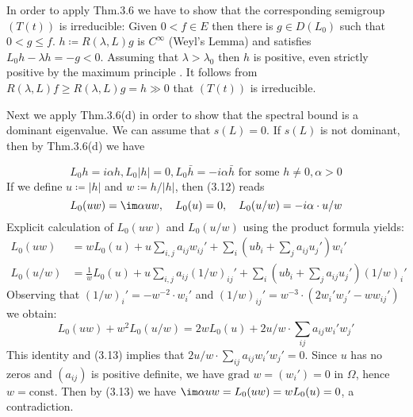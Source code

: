 \begin{examples}
	In order to apply Thm.3.6 we have to show that the corresponding semigroup $(T(t))$ is irreducible:
	Given $0 < f \in E$ then there is $g \in D(L_{0})$ such that $0 < g \leq f$.
	$h \coloneq R(\lambda,L)g$ is $C^{\infty}$ (Weyl's Lemma) and satisfies $L_{0}h - \lambda h = -g < 0$.
	Assuming that $\lambda > \lambda_{0}$ then $h$ is positive, even strictly positive by the maximum principle \citet[Chap.2, Thm.6]{protterweinberger:1967}.
	It follows from $R(\lambda,L)f \geq R(\lambda,L)g = h \gg 0$ that $(T(t))$ is irreducible.
	
	Next we apply Thm.3.6(d) in order to show that the spectral bound is a dominant eigenvalue.
	We can assume that $s(L) = 0$.
	If $s(L)$ is not dominant, then by Thm.3.6(d) we have
	
	\begin{equation}\label{eq:b3-3.12}
		L_0h = i \alpha h, L_0|h| = 0, L_0\bar{h} = -i\alpha \bar{h} 
		\text{ for some } h \ne 0, \alpha > 0
	\end{equation}
%
%
	If we define $u \coloneq |h|$ and $w \coloneq h/|h|$, then (3.12) reads
	 \begin{equation}\label{eq:b3-3.13}
	L_{0}(uw) = \im\alpha uw, \quad L_{0}(u) = 0, \quad L_{0}(u/w) = -i\alpha\cdot u/w
	\end{equation}
	Explicit calculation of $L_{0}(uw)$ and $L_{0}(u/w)$ using the product formula yields:
		\begin{equation}\label{eq:b3-3.14}
		\begin{split}
		L_{0}(uw) &=  wL_{0}(u) + u\sum_{i,j} a_{ij}w_{ij}' + \sum_{i}(ub_{i} + \sum_{j} a_{ij}u_{j}')w_{i}'\\
		L_{0}(u/w) &= \frac{1}{w}L_{0}(u) + u\sum_{i,j}a_{ij}(1/w)_{ij}' + \sum_{i}(ub_{i} + \sum_{j} a_{ij}u_{j}')(1/w)_{i}'
		\end{split}
	\end{equation}
	Observing that $(1/w)_{i}' = -w^{-2}\cdot w_{i}'$ and $(1/w)_{ij}' = w^{-3}\cdot(2w_{i}'w_{j}' - ww_{ij}')$ we obtain:
		\begin{equation}\label{eq:b3-3.15}
			L_{0}(uw) + w^{2}L_{0}(u/w) = 2wL_{0}(u) + 2u/w\cdot\sum_{ij} a_{ij}w_{i}'w_{j}'
		\end{equation}
	This identity and (3.13) implies that $2u/w\cdot\sum_{ij} a_{ij}w_{i}'w_{j}' = 0$.
	Since $u$ has no zeros and $(a_{ij})$ is positive definite, we have $\text{grad } w = (w_{i}') = 0$ in $\Omega$, hence $w = \text{const}$.
	Then by (3.13) we have $\im \alpha uw = L_{0}(uw) = wL_{0}(u) = 0$, a contradiction.


\end{examples}
